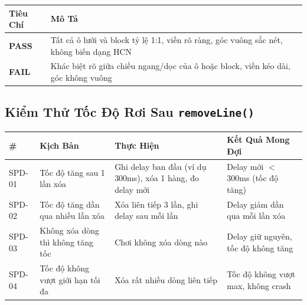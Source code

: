 \documentclass[12pt,a4paper]{article}
\begin{document}
\begin{table}[H]
\centering
{}
\begin{tabularx}{\linewidth}{|l|X|}
\hline
\rowcolor{gray!35}
\textbf{Tiêu Chí} & \textbf{Mô Tả} \\ \hline
\textbf{PASS} & Tất cả ô lưới và block tỷ lệ 1:1, viền rõ ràng, góc vuông sắc nét, không biến dạng HCN \\ \hline
\textbf{FAIL} & Khác biệt rõ giữa chiều ngang/dọc của ô hoặc block, viền kéo dài, góc không vuông \\ \hline
\end{tabularx}
\end{table}


\subsection{Kiểm Thử Tốc Độ Rơi Sau \texttt{removeLine()}}


\begin{table}[H]
\centering
{}
\begin{tabularx}{\linewidth}{|l|X|X|X|}
\hline
\rowcolor{gray!35}
\textbf{\#} & \textbf{Kịch Bản} & \textbf{Thực Hiện} & \textbf{Kết Quả Mong Đợi} \\ \hline
SPD-01 & Tốc độ tăng sau 1 lần xóa            & Ghi delay ban đầu (ví dụ 300ms), xóa 1 hàng, đo delay mới & Delay mới $<$ 300ms (tốc độ tăng) \\ \hline
SPD-02 & Tốc độ tăng dần qua nhiều lần xóa    & Xóa liên tiếp 3 lần, ghi delay sau mỗi lần & Delay giảm dần qua mỗi lần xóa \\ \hline
SPD-03 & Không xóa dòng thì không tăng tốc    & Chơi không xóa dòng nào & Delay giữ nguyên, tốc độ không tăng \\ \hline
SPD-04 & Tốc độ không vượt giới hạn tối đa    & Xóa rất nhiều dòng liên tiếp & Tốc độ không vượt max, không crash \\ \hline
\end{tabularx}
\end{table}

\end{document}
